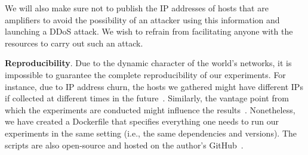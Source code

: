  We will also make sure not to publish the IP addresses of hosts that are amplifiers to avoid the possibility of an attacker using this information and launching a DDoS attack. We wish to refrain from facilitating anyone with the resources to carry out such an attack. 
 

 \textbf{Reproducibility}. Due to the dynamic character of the world's networks, it is impossible to guarantee the complete reproducibility of our experiments. For instance, due to IP address churn, the hosts we gathered might have different IPs if collected at different times in the future~\cite{griffioen_quantifying_2020}. Similarly, the vantage point from which the experiments are conducted might influence the results~\cite{wagner_united_2021}. Nonetheless, we have created a Dockerfile that specifies everything one needs to run our experiments in the same setting (i.e., the same dependencies and versions). The scripts are also open-source and hosted on the author's GitHub~\cite{rares_code}. 




